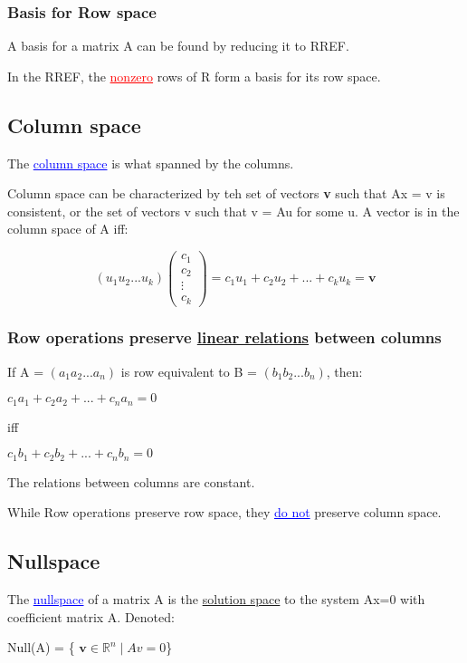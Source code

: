 \documentclass{article}
\newcommand{\bul}[1]{\textcolor{blue}{\underline{#1}}}
\newcommand{\rul}[1]{\textcolor{red}{\underline{#1}}}
\newcommand{\sbreak}{\vspace{10pt}}
\begin{document}
\subsubsection{Basis for Row space}
A basis for a matrix A can be found by reducing it to RREF.

In the RREF, the \rul{nonzero} rows of R form a basis for its row space.

\sbreak

\subsection{Column space}
The \bul{column space} is what spanned by the columns.

Column space can be characterized by teh set of vectors \textbf{v} such that Ax = v is consistent, or the set of vectors v such that v = Au for some u. A vector is in the column space of A iff:
\begin{center}
    \[
    (u_1 u_2 ... u_k)\begin{pmatrix}
        c_1\\
        c_2\\
        \vdots \\
        c_k
    \end{pmatrix} =
    c_1u_1 + c_2u_2 + ... + c_ku_k = \textbf{v}
    \]
\end{center}

\subsubsection{Row operations preserve \underline{linear relations} between columns}
If A = $(a_1 a_2 ... a_n)$ is row equivalent to B = $(b_1 b_2 ... b_n)$, then:
\begin{center}
    $c_1a_1 + c_2a_2 + ... + c_na_n = 0$
    
    \vspace{4pt}

    iff

    \vspace{4pt}

    $c_1b_1 + c_2b_2 + ... + c_nb_n = 0$
\end{center}

The relations between columns are constant.

\sbreak

While Row operations preserve row space, they \bul{do not} preserve column space.

\subsection{Nullspace}
The \bul{nullspace} of a matrix A is the \underline{solution space} to the system Ax=0 with coefficient matrix A. Denoted:
\begin{center}
    Null(A) = \{ $\textbf{v} \in \mathbb{R}^n \mid Av = 0 $\}
\end{center}
\end{document}
